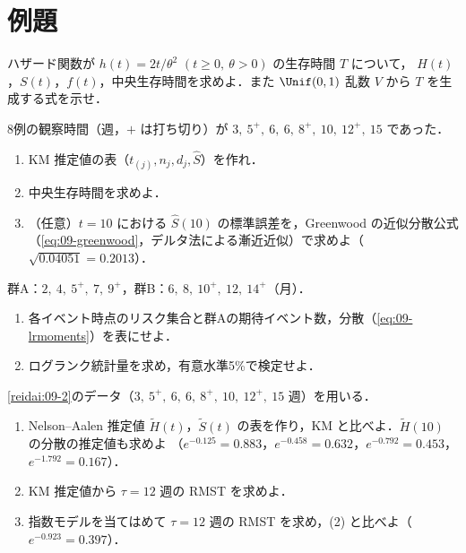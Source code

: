 \section{例題}\label{sec:09-ex}
\begin{reidai}[関数の関係]\label{reidai:09-1}
ハザード関数が $h(t)=2t/\theta^2$ $(t\ge0,\ \theta>0)$ の生存時間 $T$ について，
$H(t)$，$S(t)$，$f(t)$，中央生存時間を求めよ．また $\Unif(0,1)$ 乱数 $V$ から $T$ を生成する式を示せ．
\end{reidai}

\begin{reidai}[KM 推定と中央生存時間]\label{reidai:09-2}
8例の観察時間（週，$+$ は打ち切り）が $3,\ 5^+,\ 6,\ 6,\ 8^+,\ 10,\ 12^+,\ 15$ であった．
\begin{enumerate}[label=(\arabic*)]
\item KM 推定値の表（$t_{(j)},n_j,d_j,\hat S$）を作れ．
\item 中央生存時間を求めよ．
\item （任意）$t=10$ における $\hat S(10)$ の標準誤差を，Greenwood の近似分散公式（\cref{eq:09-greenwood}，デルタ法による漸近近似）で求めよ（$\sqrt{0.04051}=0.2013$）．
\end{enumerate}
\end{reidai}

\begin{reidai}[ログランク検定の手計算]\label{reidai:09-3}
群A：$2,\ 4,\ 5^+,\ 7,\ 9^+$，群B：$6,\ 8,\ 10^+,\ 12,\ 14^+$（月）．
\begin{enumerate}[label=(\arabic*)]
\item 各イベント時点のリスク集合と群Aの期待イベント数，分散（\cref{eq:09-lrmoments}）を表にせよ．
\item ログランク統計量を求め，有意水準5\%で検定せよ．
\end{enumerate}
\end{reidai}

\begin{reidai}\label{reidai:09-4}
\cref{reidai:09-2}のデータ（$3,\ 5^+,\ 6,\ 6,\ 8^+,\ 10,\ 12^+,\ 15$ 週）を用いる．
\begin{enumerate}[label=(\arabic*)]
\item Nelson--Aalen 推定値 $\tilde H(t)$，$\tilde S(t)$ の表を作り，KM と比べよ．$\tilde H(10)$ の分散の推定値も求めよ
（$e^{-0.125}=0.883$，$e^{-0.458}=0.632$，$e^{-0.792}=0.453$，$e^{-1.792}=0.167$）．
\item KM 推定値から $\tau=12$ 週の RMST を求めよ．
\item 指数モデルを当てはめて $\tau=12$ 週の RMST を求め，(2) と比べよ（$e^{-0.923}=0.397$）．
\end{enumerate}
\end{reidai}

